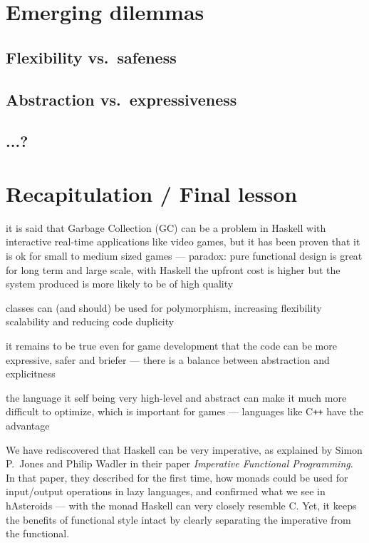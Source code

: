 \documentclass[
  digital, %
  color,   %
  table,   %
  oneside, %
  lof,     %
  lot,     %
]{fithesis3}
\newcommand{\cpp}{C\nolinebreak\texttt{+}\nolinebreak\texttt{+}}
\newcommand{\vs}{vs.\ }
\begin{document}
{\section{Emerging dilemmas}

\subsection{Flexibility \vs safeness}

\subsection{Abstraction \vs expressiveness}

\subsection{...?}


\section{Recapitulation / Final lesson}

it is said that Garbage Collection (GC) can be a problem in Haskell
with interactive real-time applications like video games, but it has been proven that
it is ok for small to medium sized games
--- paradox: pure functional design is great for long term and large scale,
with Haskell the upfront cost is higher but the system produced is more likely to be of high quality

classes can (and should) be used for polymorphism, increasing flexibility scalability and
reducing code duplicity

it remains to be true even for game development that the code can be more expressive,
safer and briefer --- there is a balance between abstraction and explicitness

the language it self being very high-level and abstract can make it much more
difficult to optimize, which is important for games --- languages like \cpp{} have the advantage

We have rediscovered that Haskell can be very imperative, as explained by Simon P.~Jones and
Philip Wadler in their paper \textit{Imperative Functional Programming}.\cite{imperativefp}
In that paper, they described for the first time, how monads could be used for input/output operations
in lazy languages, and confirmed what we see in hAsteroids ---  with the  monad
Haskell can very closely resemble C. Yet, it keeps the benefits of functional style intact by
clearly separating the imperative from the functional.




}
\end{document}
